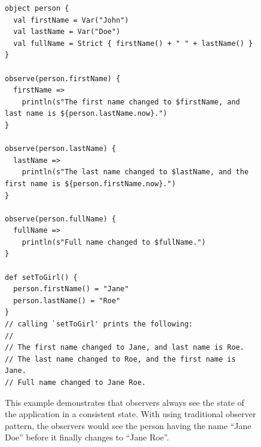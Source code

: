\begin{figure}[h!] 
\begin{lstlisting}
object person {
  val firstName = Var("John")
  val lastName = Var("Doe")
  val fullName = Strict { firstName() + " " + lastName() }
}

observe(person.firstName) {
  firstName =>
    println(s"The first name changed to $firstName, and last name is ${person.lastName.now}.")
}

observe(person.lastName) {
  lastName =>
    println(s"The last name changed to $lastName, and the first name is ${person.firstName.now}.")
}

observe(person.fullName) {
  fullName =>
    println(s"Full name changed to $fullName.")
}

def setToGirl() {          
  person.firstName() = "Jane"
  person.lastName() = "Roe"
}
// calling `setToGirl' prints the following:
//
// The first name changed to Jane, and last name is Roe.
// The last name changed to Roe, and the first name is Jane.
// Full name changed to Jane Roe.
\end{lstlisting}
\caption{This example demonstrates that observers always see the state of the application in a consistent state. With using traditional observer pattern, the observers would see the person having the name ``Jane Doe'' before it finally changes to ``Jane Roe''.}
\label{fig:example_scala-react-consistency}
\end{figure}










